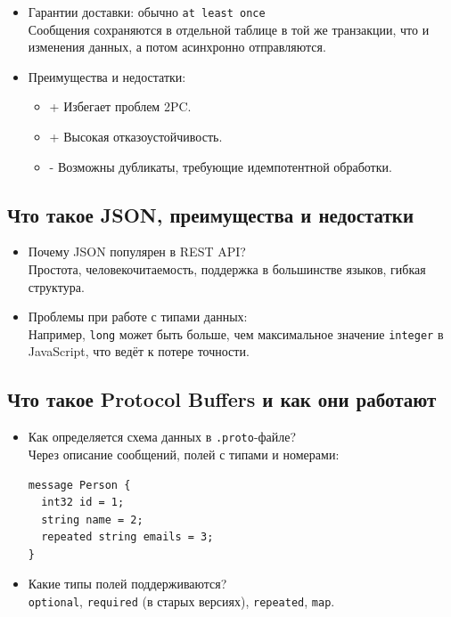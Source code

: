 \documentclass[a4paper,14pt]{article}
\begin{document}
\begin{itemize}
\item Гарантии доставки: обычно \texttt{at least once} \\
Сообщения сохраняются в отдельной таблице в той же транзакции, что и изменения данных, а потом асинхронно отправляются.

\item Преимущества и недостатки: \\
\begin{itemize}
  \item + Избегает проблем 2PC.
  \item + Высокая отказоустойчивость.
  \item - Возможны дубликаты, требующие идемпотентной обработки.
\end{itemize}
\end{itemize}

\subsection{Что такое JSON, преимущества и недостатки}

\begin{itemize}
\item Почему JSON популярен в REST API? \\
Простота, человекочитаемость, поддержка в большинстве языков, гибкая структура.

\item Проблемы при работе с типами данных: \\
Например, \texttt{long} может быть больше, чем максимальное значение \texttt{integer} в JavaScript, что ведёт к потере точности.
\end{itemize}

\subsection{Что такое Protocol Buffers и как они работают}

\begin{itemize}
\item Как определяется схема данных в \texttt{.proto}-файле? \\
Через описание сообщений, полей с типами и номерами:
\begin{lstlisting}[style=javastyle]
message Person {
  int32 id = 1;
  string name = 2;
  repeated string emails = 3;
}
\end{lstlisting}

\item Какие типы полей поддерживаются? \\
\texttt{optional}, \texttt{required} (в старых версиях), \texttt{repeated}, \texttt{map}.
\end{itemize}
\end{document}
